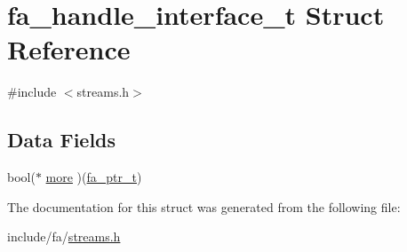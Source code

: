 \hypertarget{structfa__handle__interface__t}{\section{fa\-\_\-handle\-\_\-interface\-\_\-t Struct Reference}
\label{structfa__handle__interface__t}
}


{\ttfamily \#include $<$streams.\-h$>$}

\subsection*{Data Fields}
\begin{DoxyCompactItemize}
\item 
bool($\ast$ \hyperlink{group___fa_gade9539fe9fdf3b012ededf7bf5208d38}{more} )(\hyperlink{group___fa_ga915ddeae99ad7568b273d2b876425197}{fa\-\_\-ptr\-\_\-t})
\end{DoxyCompactItemize}


The documentation for this struct was generated from the following file\-:\begin{DoxyCompactItemize}
\item 
include/fa/\hyperlink{streams_8h}{streams.\-h}\end{DoxyCompactItemize}
